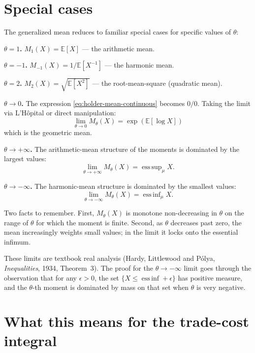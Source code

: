 \documentclass[11pt,letterpaper,oneside]{book}
\theoremstyle{definition}
\theoremstyle{remark}
\DeclareMathOperator*{\essinf}{ess\,inf}
\DeclareMathOperator*{\esssup}{ess\,sup}
\newcommand{\E}{\mathbb{E}}
\begin{document}
\section{Special cases}

The generalized mean reduces to familiar special cases for specific values of $\theta$:

\textbf{$\theta = 1$.} $M_1(X) = \E[X]$ --- the arithmetic mean.

\textbf{$\theta = -1$.} $M_{-1}(X) = 1/\E[X^{-1}]$ --- the harmonic mean.

\textbf{$\theta = 2$.} $M_2(X) = \sqrt{\E[X^2]}$ --- the root-mean-square (quadratic mean).

\textbf{$\theta \to 0$.} The expression \eqref{eq:holder-mean-continuous} becomes $0/0$. Taking the limit via L'Hôpital or direct manipulation:
\begin{equation}
\lim_{\theta \to 0} M_\theta(X) = \exp(\E[\log X])
\end{equation}
which is the geometric mean.

\textbf{$\theta \to +\infty$.} The arithmetic-mean structure of the moments is dominated by the largest values:
\begin{equation}
\lim_{\theta \to +\infty} M_\theta(X) = \esssup_\mu X.
\end{equation}

\textbf{$\theta \to -\infty$.} The harmonic-mean structure is dominated by the smallest values:
\begin{equation}
\lim_{\theta \to -\infty} M_\theta(X) = \essinf_\mu X.
\label{eq:harmonic-limit}
\end{equation}

\begin{tcolorbox}[insight]
Two facts to remember. First, $M_\theta(X)$ is monotone non-decreasing in $\theta$ on the range of $\theta$ for which the moment is finite. Second, as $\theta$ decreases past zero, the mean increasingly weights small values; in the limit it locks onto the essential infimum.
\end{tcolorbox}

These limits are textbook real analysis (Hardy, Littlewood and P\'olya, \emph{Inequalities}, 1934, Theorem~3). The proof for the $\theta \to -\infty$ limit goes through the observation that for any $\epsilon > 0$, the set $\{X \leq \essinf + \epsilon\}$ has positive measure, and the $\theta$-th moment is dominated by mass on that set when $\theta$ is very negative.

\section{What this means for the trade-cost integral}
\end{document}
